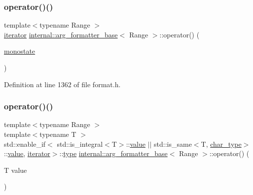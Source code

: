\subsubsection{\texorpdfstring{operator()()}{operator()()}\hspace{0.1cm}{\footnotesize\ttfamily [1/6]}}
{\footnotesize\ttfamily template$<$typename Range $>$ \\
\hyperlink{classinternal_1_1arg__formatter__base_a87622fdc9716fee6a6de2ae496e3a54f}{iterator} \hyperlink{classinternal_1_1arg__formatter__base}{internal\+::arg\+\_\+formatter\+\_\+base}$<$ Range $>$\+::operator() (\begin{DoxyParamCaption}\item[{\hyperlink{structmonostate}{monostate}}]{ }\end{DoxyParamCaption})\hspace{0.3cm}{\ttfamily [inline]}}



Definition at line 1362 of file format.\+h.

\mbox{\label{classinternal_1_1arg__formatter__base_a7cf58948dafdb66e977cfadb03176de5}} 
\subsubsection{\texorpdfstring{operator()()}{operator()()}\hspace{0.1cm}{\footnotesize\ttfamily [2/6]}}
{\footnotesize\ttfamily template$<$typename Range $>$ \\
template$<$typename T $>$ \\
std\+::enable\+\_\+if$<$ std\+::is\+\_\+integral$<$T$>$\+::\hyperlink{classinternal_1_1value}{value} $\vert$$\vert$ std\+::is\+\_\+same$<$T, \hyperlink{classinternal_1_1arg__formatter__base_a407930bf282880d2ca45dfa8f5d2034b}{char\+\_\+type}$>$\+::\hyperlink{classinternal_1_1value}{value}, \hyperlink{classinternal_1_1arg__formatter__base_a87622fdc9716fee6a6de2ae496e3a54f}{iterator}$>$\+::\hyperlink{namespaceinternal_a8661864098ac0acff9a6dd7e66f59038}{type} \hyperlink{classinternal_1_1arg__formatter__base}{internal\+::arg\+\_\+formatter\+\_\+base}$<$ Range $>$\+::operator() (\begin{DoxyParamCaption}\item[{T}]{value }\end{DoxyParamCaption})\hspace{0.3cm}{\ttfamily [inline]}}



